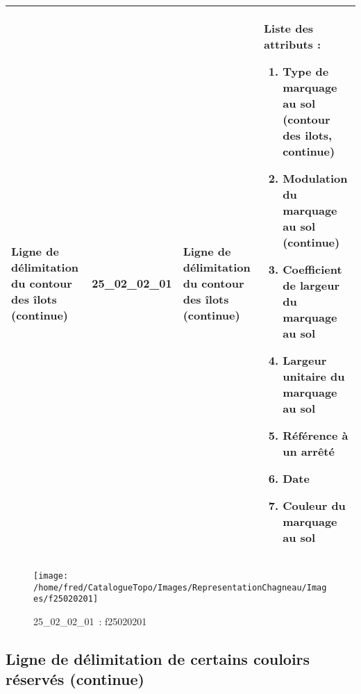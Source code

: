 \documentclass[12pt,titlepage]{book}
\begin{document}
\renewcommand{\arraystretch}{1.2}
\begin{supertabular}{|p{10cm}|c|p{13cm}|p{12cm}|}
 Ligne de délimitation du contour des îlots (continue) & 25\_02\_02\_01 & Ligne de délimitation du contour des îlots (continue) & Liste des attributs :
\begin{enumerate}
  \item Type de marquage au sol (contour des ilots, continue)  \item Modulation du marquage au sol (continue)  \item Coefficient de largeur du marquage au sol  \item Largeur unitaire du marquage au sol  \item Référence à un arrêté  \item Date  \item Couleur du marquage au sol\end{enumerate}
\\
\hline
\end{supertabular}
\begin{figure}[h!]
  \hfill         %
  \begin{minipage}[t]{3cm}
    \begin{center}
      \texttt{[image: /home/fred/CatalogueTopo/Images/RepresentationChagneau/Images/f25020201]}
      \caption[~25\_02\_02\_01]{\small{25\_02\_02\_01~:} \tiny{f25020201}}\label{f25020201}
    \end{center}
  \end{minipage}
\end{figure}


\subsection{Ligne de délimitation de certains couloirs réservés (continue)}
\noindent
\vspace{\baselineskip}
\end{document}
